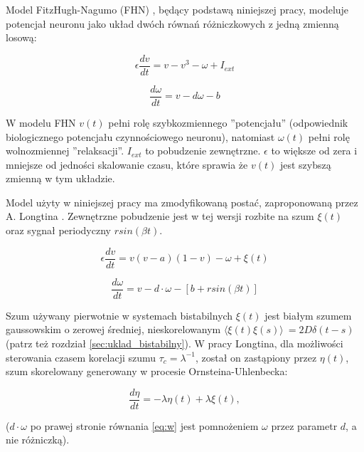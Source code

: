  Model FitzHugh-Nagumo (FHN) \cite{fitzhugh}, będący podstawą niniejszej pracy, modeluje potencjał neuronu jako układ dwóch równań różniczkowych z jedną zmienną losową:

  \begin{equation}
    \epsilon \frac{dv}{dt} = v - v^3 - \omega + I_{ext}
  \end{equation}

  \begin{equation}
    \frac{d \omega}{dt} = v - d \omega - b
  \end{equation}

  W modelu FHN $v(t)$ pełni rolę szybkozmiennego ''potencjału'' (odpowiednik biologicznego potencjału czynnościowego neuronu), natomiast $\omega (t)$ pełni rolę wolnozmiennej ''relaksacji''. $I_{ext}$ to pobudzenie zewnętrzne. $\epsilon$ to większe od zera i mniejsze od jedności skalowanie czasu, które sprawia że $v(t)$ jest szybszą zmienną w tym układzie.


  Model użyty w niniejszej pracy ma zmodyfikowaną postać, zaproponowaną przez A. Longtina \cite{longtin}. Zewnętrzne pobudzenie jest w tej wersji rozbite na szum $\xi(t)$ oraz sygnał periodyczny $r sin(\beta t)$.

  \begin{equation} \label{eq:v}
    \epsilon \frac{dv}{dt} = v(v-a)(1-v)- \omega + \xi(t)
  \end{equation}

  \begin{equation} \label{eq:w}
    \frac{d \omega}{dt} = v - d \cdot \omega - [b + r sin(\beta t)]
  \end{equation}

  Szum używany pierwotnie w systemach bistabilnych $\xi(t)$ jest białym szumem gaussowskim o zerowej średniej, nieskorelowanym $\langle \xi(t) \xi(s) \rangle\ = 2 D \delta (t-s)$ (patrz też rozdział \ref{sec:uklad_bistabilny}). W pracy Longtina, dla możliwości sterowania czasem korelacji szumu $\tau_c = \lambda^{-1}$, został on zastąpiony przez $\eta(t)$, szum skorelowany generowany w procesie Ornsteina-Uhlenbecka:

  \begin{equation} \label{eq:eta}
    \frac{d \eta}{dt} = -\lambda \eta(t) + \lambda \xi(t) ,
  \end{equation}

  ($d \cdot \omega$ po prawej stronie równania \ref{eq:w} jest pomnożeniem $\omega$ przez parametr $d$, a nie różniczką).

